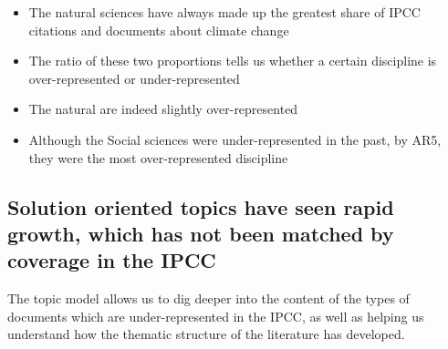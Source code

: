 \documentclass{article}
\begin{document}
\begin{itemize}
	\item The natural sciences have always made up the greatest share of IPCC citations and documents about climate change
	\item The ratio of these two proportions tells us whether a certain discipline is over-represented or under-represented
	\item The natural are indeed slightly over-represented
	\item Although the Social sciences were under-represented in the past, by AR5, they were the most over-represented discipline

\end{itemize}

\bigskip

\subsection{Solution oriented topics have seen rapid growth, which has not been matched by coverage in the IPCC}

The topic model allows us to dig deeper into the content of the types of documents which are under-represented in the IPCC, as well as helping us understand how the thematic structure of the literature has developed.
\end{document}
